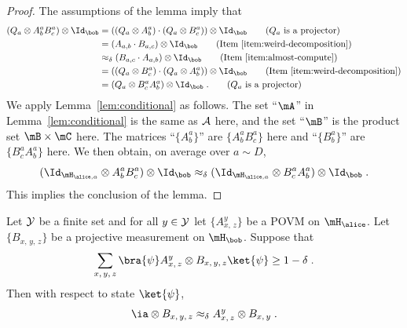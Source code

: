 \begin{proof}
  The assumptions of the lemma imply that
  \begin{align*}
    (Q_a \otimes A^a_b B^a_c) \otimes \Id_\bob
    & = ((Q_a \otimes A^a_b) \cdot (Q_a \otimes B^a_c)) \otimes \Id_\bob
      \tag{$Q_a$ is a projector}\\
    & = (A_{a, b} \cdot B_{a, c}) \otimes \Id_\bob
      \tag{Item~\ref{item:weird-decomposition}}\\
    & \approx_\delta (B_{a, c} \cdot A_{a, b}) \otimes \Id_\bob
      \tag{Item~\ref{item:almost-compute}}\\
    & = ((Q_a \otimes B^a_c) \cdot (Q_a \otimes A^a_b)) \otimes \Id_\bob
      \tag{Item~\ref{item:weird-decomposition}}\\
    & = (Q_a \otimes B^a_c A^a_b) \otimes \Id_\bob\;.
      \tag{$Q_a$ is a projector}
  \end{align*}
  We apply Lemma~\ref{lem:conditional} as follows.
  The set ``$\mA$'' in Lemma~\ref{lem:conditional} is the same as $\cal{A}$
  here, and the set ``$\mB$'' is the product set $\mB \times \mC$ here.
  The matrices ``$\{A^a_b\}$'' are $\{A^a_{b}B^a_c\}$ here and ``$\{B^{a}_b\}$''
  are $\{B^a_c A^a_{b}\}$ here.
  We then obtain, on average over $a \sim
  D$,
  \begin{equation*}
    (\Id_{\mH_{\alice, a}}\otimes A^{a}_b B^a_c) \otimes \Id_\bob
    \approx_\delta (\Id_{\mH_{\alice, a}} \otimes B^{a}_c A^a_b) \otimes \Id_\bob\;.
  \end{equation*}
  This implies the conclusion of the lemma.
\end{proof}

\begin{lemma}
  \label{lem:conditional-consistency}
	Let $ \cal{Y}$ be a finite set and for all $y\in \cal{Y}$ let $\{A^y_{x,\, z}\}$ be a POVM on $\mH_\alice$. Let 
  $\{B_{x,\, y,\, z}\}$ be a projective measurement on $\mH_\bob$.
  Suppose that
  \begin{equation}\label{eq:cc-1}
    \sum_{x,\, y,\, z} \bra{\psi} A^y_{x,\, z} \otimes B_{x,\, y,\, z}
    \ket{\psi} \ge 1 - \delta\;.
  \end{equation}
  Then with respect to state $\ket{\psi}$,
  \begin{equation*}
    \ia \otimes B_{x,\, y,\, z} \approx_\delta A^y_{x,\, z} \otimes B_{x,\,
      y}\;.
  \end{equation*}
\end{lemma}

